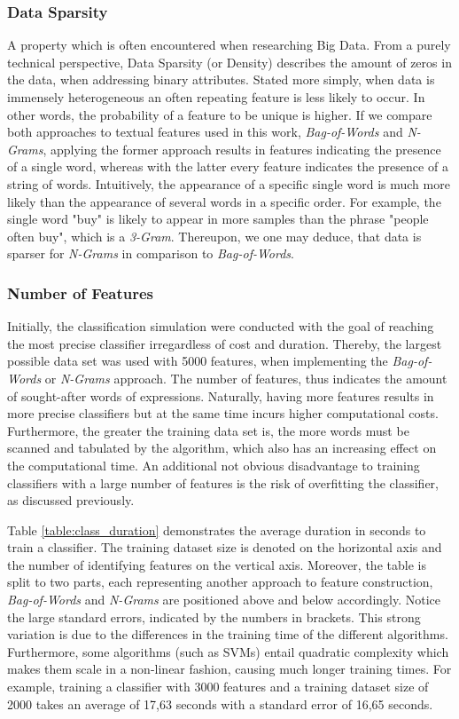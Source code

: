 		\subsubsection{Data Sparsity}
			\label{data_sparsity}
			A property which is often encountered when researching Big Data. From a purely technical perspective, Data Sparsity (or Density) describes the amount of zeros in the data, when addressing binary attributes. Stated more simply, when data is immensely heterogeneous an often repeating feature is less likely to occur. In other words, the probability of a feature to be unique is higher. If we compare both approaches to textual features used in this work, \textit{Bag-of-Words} and \textit{N-Grams}, applying the former approach results in features indicating the presence of a single word, whereas with the latter every feature indicates the presence of a string of words. Intuitively, the appearance of a specific single word is much more likely than the appearance of several words in a specific order. For example, the single word "buy" is likely to appear in more samples than the phrase "people often buy", which is a \textit{3-Gram}. Thereupon, we one may deduce, that data is sparser for \textit{N-Grams} in comparison to \textit{Bag-of-Words}.
		
		\subsubsection{Number of Features}
			Initially, the classification simulation were conducted with the goal of reaching the most precise classifier irregardless of cost and duration. Thereby, the largest possible data set was used with 5000 features, when implementing the \textit{Bag-of-Words} or \textit{N-Grams} approach. The number of features, thus indicates the amount of sought-after words of expressions. Naturally, having more features results in more precise classifiers but at the same time incurs higher computational costs. Furthermore, the greater the training data set is, the more words must be scanned and tabulated by the algorithm, which also has an increasing effect on the computational time. An additional not obvious disadvantage to training classifiers with a large number of features is the risk of overfitting the classifier, as discussed previously. 
			
			\par
			Table \ref{table:class_duration} demonstrates the average duration in seconds to train a classifier. The training dataset size is denoted on the horizontal axis and the number of identifying features on the vertical axis. Moreover, the table is split to two parts, each representing another approach to feature construction, \textit{Bag-of-Words} and \textit{N-Grams} are positioned above and below accordingly. Notice the large standard errors, indicated by the numbers in brackets. This strong variation is due to the differences in the training time of the different algorithms. Furthermore, some algorithms (such as SVMs) entail quadratic complexity which makes them scale in a non-linear fashion, causing much longer training times. For example, training a classifier with 3000 features and a training dataset size of 2000 takes an average of 17,63 seconds with a standard error of 16,65 seconds.
			
